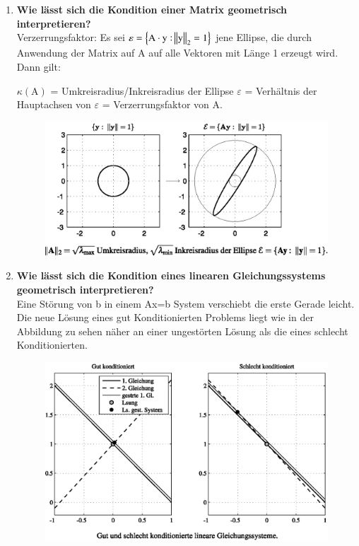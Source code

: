 \begin{enumerate}
		\pagebreak
		
		\item \textbf{Wie lässt sich die Kondition einer Matrix geometrisch interpretieren?} \\
			Verzerrungsfaktor:
			Es sei \(\varepsilon=\left\lbrace \text{A}\cdot\text{y}:\norm{\text{y}}_2=1 \right\rbrace \) jene Ellipse, die durch Anwendung der Matrix auf A auf alle Vektoren mit Länge 1 erzeugt wird. Dann gilt:
			\begin{center}
				\(\kappa(\text{A}) \) = Umkreisradius/Inkreisradius der Ellipse \(\varepsilon\) = Verhältnis der Hauptachsen von \(\varepsilon\) = Verzerrungsfaktor von A.
			\end{center}
			\begin{figure}[htbp]
				\centering
				\includegraphics[width=0.6\linewidth]{kap5_1}
			\end{figure}
		
		
		\item \textbf{Wie lässt sich die Kondition eines linearen Gleichungssystems geometrisch interpretieren?} \\
			Eine Störung von b in einem Ax=b System verschiebt die erste Gerade leicht. Die neue Lösung eines gut Konditionierten Problems liegt wie in der Abbildung zu sehen näher an einer ungestörten Lösung als die eines schlecht Konditionierten.
			\begin{figure}[htbp]
				\centering
				\includegraphics[width=0.6\linewidth]{kap5_2}
			\end{figure}
		

\end{enumerate}
